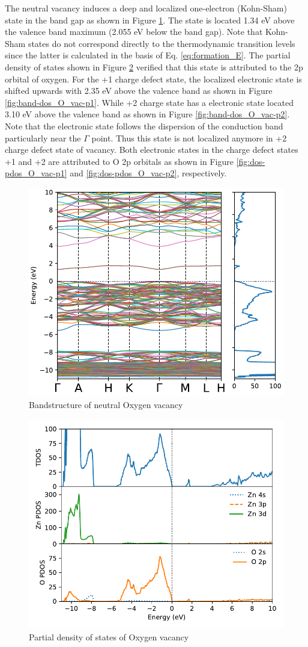 The neutral  vacancy induces a deep and localized one-electron (Kohn-Sham) state in the band gap as shown in Figure \ref{fig:band-dos_O_vac}. The state is located 1.34 eV above the valence band maximum (2.055 eV below the band gap). Note that Kohn-Sham states do not correspond directly to the thermodynamic transition levels since the latter is calculated in the basis of Eq. \eqref{eq:formation_E}. The partial density of states shown in Figure \ref{fig:dos-pdos_O_vac} verified that this state is attributed to the 2p orbital of oxygen. For the +1 charge defect state, the localized electronic state is shifted upwards with 2.35 eV above the valence band as shown in Figure  \ref{fig:band-dos_O_vac-p1}.  While +2 charge state has a electronic state located 3.10 eV above the valence band as shown in Figure \ref{fig:band-dos_O_vac-p2}. Note that the electronic state follows the dispersion of the conduction band particularly near the $\Gamma$ point. Thus this state is not localized anymore in +2 charge defect state of  vacancy. Both electronic states in the charge defect states +1 and +2 are attributed to O 2p orbitals as shown in Figure \ref{fig:dos-pdos_O_vac-p1} and \ref{fig:dos-pdos_O_vac-p2}, respectively. 


\begin{figure}[tbh!]
	\centering
	\includegraphics[width=0.6\linewidth]{"images/rnd/band-dos_O_vac"}
	\caption[Bandstructure of neutral Oxygen vacancy]{Bandstructure of neutral Oxygen vacancy}
	\label{fig:band-dos_O_vac}
\end{figure}

\begin{figure}[tbh!]
	\centering
	\includegraphics[width=0.6\linewidth]{"images/rnd/dos-pdos_O_vac"}
	\caption[Partial density of states of Oxygen vacancy]{Partial density of states of Oxygen vacancy}
	\label{fig:dos-pdos_O_vac}
\end{figure}

